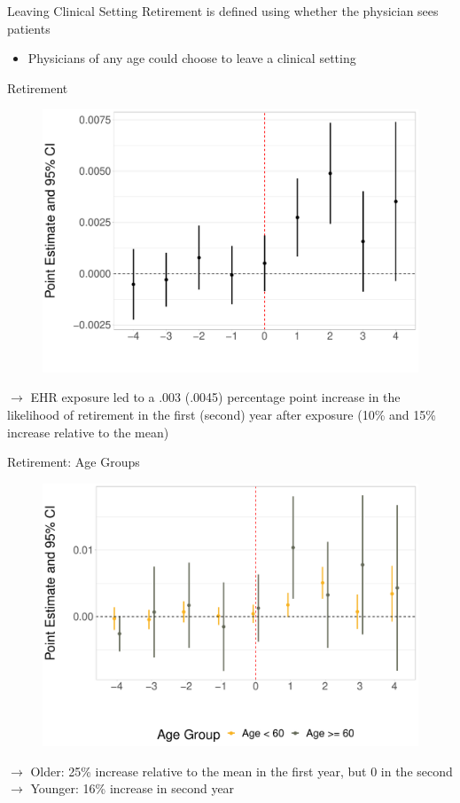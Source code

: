 \documentclass[10pt]{beamer}
\begin{document}
\begin{frame}{Leaving Clinical Setting}
Retirement is defined using whether the physician sees patients
                \vspace{3mm}
\begin{itemize}
    \item Physicians of any age could choose to leave a clinical setting
\end{itemize}
\end{frame}
\begin{frame}{Retirement}
\begin{figure}[ht]
    \centering
    \includegraphics[scale=.35]{Objects/Presentation_retire_all.pdf}
\end{figure}
$\rightarrow$ EHR exposure led to a .003 (.0045) percentage point increase in the likelihood of retirement in the first (second) year after exposure (10\% and 15\% increase relative to the mean)
\end{frame}

\begin{frame}{Retirement: Age Groups}
\begin{figure}[ht]
\centering
\includegraphics[scale=.35]{Objects/Presentation_retire_ages.pdf}
\end{figure}
$\rightarrow$ Older: 25\% increase relative to the mean in the first year, but 0 in the second\\
$\rightarrow$ Younger: 16\% increase in second year
\end{frame}
\end{document}
